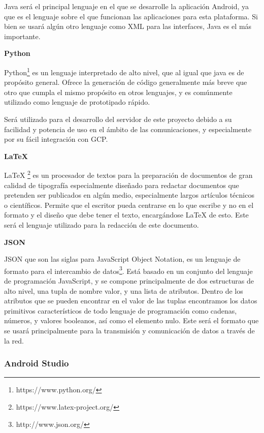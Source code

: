 Java será el principal lenguaje en el que se desarrolle la aplicación Android, ya que es el lenguaje sobre el que funcionan las aplicaciones para esta plataforma. Si bien se usará algún otro lenguaje como XML para las interfaces, Java es el más importante.

\textbf{Python}

Python\footnote{https://www.python.org/} es un lenguaje interpretado de alto nivel, que al igual que java es de propósito general. Ofrece la generación de código generalmente más breve que otro que cumpla el mismo propósito en otros lenguajes, y es comúnmente utilizado como lenguaje de prototipado rápido. 

Será utilizado para el desarrollo del servidor de este proyecto debido a su facilidad y potencia de uso en el ámbito de las comunicaciones, y especialmente por su fácil integración con \acf{GCP}.

\textbf{LaTeX}

LaTeX \footnote{https://www.latex-project.org/} es un procesador de textos para la preparación de documentos de gran calidad de tipografía especialmente diseñado para redactar documentos que pretenden ser publicados en algún medio, especialmente largos artículos técnicos o científicos. Permite que el escritor pueda centrarse en lo que escribe y no en el formato y el diseño que debe tener el texto, encargándose LaTeX de esto. Este será el lenguaje utilizado para la redacción de este documento.

\textbf{JSON}

JSON que son las siglas para JavaScript Object Notation, es un lenguaje de formato para el intercambio de datos\footnote{http://www.json.org/}. Está basado en un conjunto del lenguaje de programación JavaScript, y se compone principalmente de dos estructuras de alto nivel, una tupla de nombre valor, y una lista de atributos. Dentro de los atributos que se pueden encontrar en el valor de las tuplas encontramos los datos primitivos característicos de todo lenguaje de programación como cadenas, números, y valores booleanos, así como el elemento nulo. Este será el formato que se usará principalmente para la transmisión y comunicación de datos a través de la red.


\subsubsection{Android Studio}

